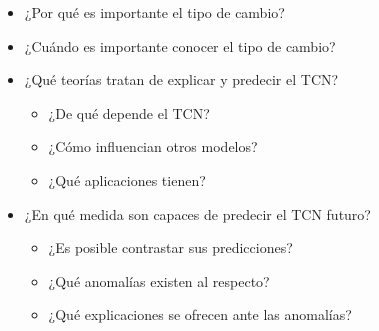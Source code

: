 \documentclass{nuevotema}
\begin{document}
\ideaclave

\begin{itemize}
	\item ¿Por qué es importante el tipo de cambio?
	\item ¿Cuándo es importante conocer el tipo de cambio?
	\item ¿Qué teorías tratan de explicar y predecir el TCN?
	\begin{itemize}
		\item ¿De qué depende el TCN?
		\item ¿Cómo influencian otros modelos?
		\item ¿Qué aplicaciones tienen?
	\end{itemize}
	\item ¿En qué medida son capaces de predecir el TCN futuro?
	\begin{itemize}
		\item ¿Es posible contrastar sus predicciones?
		\item ¿Qué anomalías existen al respecto?
		\item ¿Qué explicaciones se ofrecen ante las anomalías?
	\end{itemize}
\end{itemize}

\esquemacorto
\end{document}
